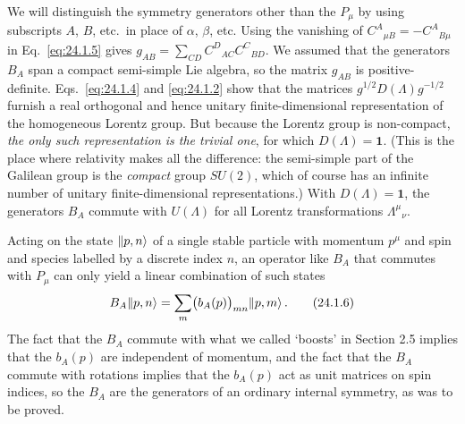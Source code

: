 We will distinguish the symmetry generators other than the $P_\mu$ by using
subscripts $A$, $B$, etc.\ in place of $\alpha$, $\beta$, etc. Using the
vanishing of $C^A{}_{\mu B}=-C^A{}_{B\mu}$ in Eq.~\eqref{eq:24.1.5} gives
$g_{AB}=\sum_{CD}C^D{}_{AC}C^C{}_{BD}$. We assumed that the generators $B_A$
span a compact semi-simple Lie algebra, so the matrix $g_{AB}$ is
positive-definite. Eqs.~\eqref{eq:24.1.4} and \eqref{eq:24.1.2} show that the
matrices $g^{1/2}D(\Lambda)g^{-1/2}$ furnish a real orthogonal and hence unitary
finite-dimensional representation of the homogeneous Lorentz group. But
because the Lorentz group is non-compact, \emph{the only such representation is
the trivial one}, for which $D(\Lambda)=\mathbf{1}$. (This is the place where
relativity makes all the difference: the semi-simple part of the Galilean group
is the \emph{compact} group $SU(2)$, which of course has an infinite number of
unitary finite-dimensional representations.) With
$D(\Lambda)=\mathbf{1}$, the generators $B_A$ commute with $U(\Lambda)$ for all
Lorentz transformations $\Lambda^\mu{}_\nu$.

Acting on the state $\lVert p,n\rangle$ of a single stable particle with momentum
$p^\mu$ and spin and species labelled by a discrete index $n$, an operator like
$B_A$ that commutes with $P_\mu$ can only yield a linear combination of such
states
\begin{equation}
  B_A\lVert p,n\rangle
  =\sum_m\bigl(b_A(p)\bigr)_{mn}\lVert p,m\rangle\,.
  \tag{24.1.6}\label{eq:24.1.6}
\end{equation}
The fact that the $B_A$ commute with what we called `boosts' in Section 2.5
implies that the $b_A(p)$ are independent of momentum, and the fact that the
$B_A$ commute with rotations implies that the $b_A(p)$ act as unit matrices on
spin indices, so the $B_A$ are the generators of an ordinary internal
symmetry, as was to be proved.
